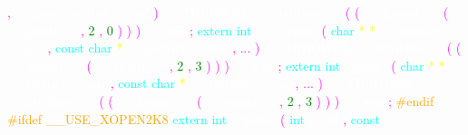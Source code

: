 \textcolor{magenta}{,} 
\textcolor{white}{\_\_gnuc\_va\_list} 
\textcolor{white}{\_\_arg} 
\textcolor{magenta}{)} 
\textcolor{white}{\_\_THROWNL} 
\textcolor{white}{\_\_attribute\_\_} 
\textcolor{magenta}{(} 
\textcolor{magenta}{(} 
\textcolor{white}{\_\_format\_\_} 
\textcolor{magenta}{(} 
\textcolor{white}{\_\_printf\_\_} 
\textcolor{magenta}{,} 
\textcolor{green}{2} 
\textcolor{magenta}{,} 
\textcolor{green}{0} 
\textcolor{magenta}{)} 
\textcolor{magenta}{)} 
\textcolor{magenta}{)} 
\textcolor{white}{\_\_wur} 
\textcolor{magenta}{;} 
\textcolor{cyan}{extern} 
\textcolor{cyan}{int} 
\textcolor{white}{\_\_asprintf} 
\textcolor{magenta}{(} 
\textcolor{cyan}{char} 
\textcolor{yellow}{*} 
\textcolor{yellow}{*} 
\textcolor{white}{\_\_restrict} 
\textcolor{white}{\_\_ptr} 
\textcolor{magenta}{,} 
\textcolor{cyan}{const} 
\textcolor{cyan}{char} 
\textcolor{yellow}{*} 
\textcolor{white}{\_\_restrict} 
\textcolor{white}{\_\_fmt} 
\textcolor{magenta}{,} 
\textcolor{magenta}{...} 
\textcolor{magenta}{)} 
\textcolor{white}{\_\_THROWNL} 
\textcolor{white}{\_\_attribute\_\_} 
\textcolor{magenta}{(} 
\textcolor{magenta}{(} 
\textcolor{white}{\_\_format\_\_} 
\textcolor{magenta}{(} 
\textcolor{white}{\_\_printf\_\_} 
\textcolor{magenta}{,} 
\textcolor{green}{2} 
\textcolor{magenta}{,} 
\textcolor{green}{3} 
\textcolor{magenta}{)} 
\textcolor{magenta}{)} 
\textcolor{magenta}{)} 
\textcolor{white}{\_\_wur} 
\textcolor{magenta}{;} 
\textcolor{cyan}{extern} 
\textcolor{cyan}{int} 
\textcolor{white}{asprintf} 
\textcolor{magenta}{(} 
\textcolor{cyan}{char} 
\textcolor{yellow}{*} 
\textcolor{yellow}{*} 
\textcolor{white}{\_\_restrict} 
\textcolor{white}{\_\_ptr} 
\textcolor{magenta}{,} 
\textcolor{cyan}{const} 
\textcolor{cyan}{char} 
\textcolor{yellow}{*} 
\textcolor{white}{\_\_restrict} 
\textcolor{white}{\_\_fmt} 
\textcolor{magenta}{,} 
\textcolor{magenta}{...} 
\textcolor{magenta}{)} 
\textcolor{white}{\_\_THROWNL} 
\textcolor{white}{\_\_attribute\_\_} 
\textcolor{magenta}{(} 
\textcolor{magenta}{(} 
\textcolor{white}{\_\_format\_\_} 
\textcolor{magenta}{(} 
\textcolor{white}{\_\_printf\_\_} 
\textcolor{magenta}{,} 
\textcolor{green}{2} 
\textcolor{magenta}{,} 
\textcolor{green}{3} 
\textcolor{magenta}{)} 
\textcolor{magenta}{)} 
\textcolor{magenta}{)} 
\textcolor{white}{\_\_wur} 
\textcolor{magenta}{;} 
\textcolor{orange}{\#endif} 
\textcolor{orange}{\#ifdef \_\_USE\_XOPEN2K8} 
\textcolor{cyan}{extern} 
\textcolor{cyan}{int} 
\textcolor{white}{vdprintf} 
\textcolor{magenta}{(} 
\textcolor{cyan}{int} 
\textcolor{white}{\_\_fd} 
\textcolor{magenta}{,} 
\textcolor{cyan}{const} 
